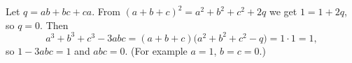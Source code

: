 Let $q=ab+bc+ca$. From $(a+b+c)^2=a^2+b^2+c^2+2q$ we get $1=1+2q$, so $q=0$. Then
\[
a^3+b^3+c^3-3abc=(a+b+c)\bigl(a^2+b^2+c^2-q\bigr)=1\cdot1=1,
\]
so $1-3abc=1$ and $abc=\boxed{0}$. (For example $a=1$, $b=c=0$.)
